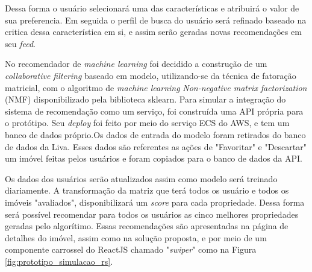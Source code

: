 Dessa forma o usuário selecionará uma das características e atribuirá o valor de sua preferencia. Em seguida o perfil de busca do usuário será refinado baseado na critica dessa característica em si, e assim serão geradas novas recomendações em seu \textit{feed}.

No recomendador de \textit{machine learning} foi decidido a construção de um \textit{collaborative filtering} baseado em modelo, utilizando-se da técnica de fatoração matricial, com o algoritmo de \textit{machine learning} \textit{Non-negative matrix factorization} (NMF) disponibilizado pela biblioteca sklearn. Para simular a integração do sistema de recomendação como um serviço, foi construída uma API própria para o protótipo. Seu \textit{deploy} foi feito por meio do serviço ECS do AWS, e tem um banco de dados próprio.Os dados de entrada do modelo foram retirados do banco de dados da Liva. Esses dados são referentes as ações de "Favoritar" e "Descartar" um imóvel feitas pelos usuários e foram copiados para o banco de dados da API.

Os dados dos usuários serão atualizados assim como modelo será treinado diariamente. A transformação da matriz que terá todos os usuário e todos os imóveis "avaliados", disponibilizará um \textit{score} para cada propriedade. Dessa forma será possível recomendar para todos os usuários as cinco melhores propriedades geradas pelo algorítimo. Essas recomendações são apresentadas na página de detalhes do imóvel, assim como na solução proposta, e por meio de um componente carrossel do ReactJS chamado "\textit{swiper}" como na Figura \ref{fig:prototipo_simulacao_rs}.


